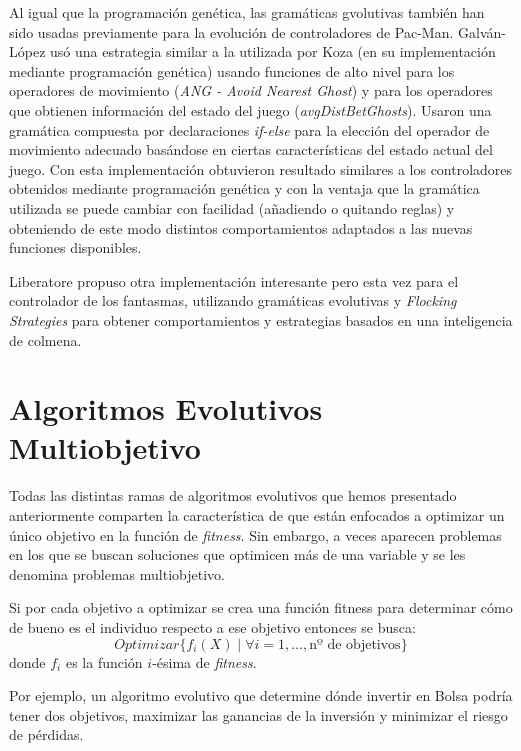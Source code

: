 \blankline

Al igual que la programación genética, las gramáticas gvolutivas también han sido usadas previamente para la evolución de controladores de Pac-Man. Galván-López \cite{galvan2010evolving} usó una estrategia similar a la utilizada por Koza (en su implementación mediante programación genética) usando funciones de alto nivel para los operadores de movimiento (\textit{ANG - Avoid Nearest Ghost}) y para los operadores que obtienen información del estado del juego (\textit{avgDistBetGhosts}). Usaron una gramática compuesta por declaraciones \textit{if-else} para la elección del operador de movimiento adecuado basándose en ciertas características del estado actual del juego. Con esta implementación obtuvieron resultado similares a los controladores obtenidos mediante programación genética y con la ventaja que la gramática utilizada se puede cambiar con facilidad (añadiendo o quitando reglas) y obteniendo de este modo distintos comportamientos adaptados a las nuevas funciones disponibles.

Liberatore \cite{Liberatore2014} propuso otra implementación interesante pero esta vez para el controlador de los fantasmas, utilizando gramáticas evolutivas y \textit{Flocking Strategies} para obtener comportamientos y estrategias basados en una inteligencia de colmena.

\section{Algoritmos Evolutivos Multiobjetivo}
Todas las distintas ramas de algoritmos evolutivos que hemos presentado anteriormente comparten la característica de que están enfocados a optimizar  un único objetivo en la  función de \textit{fitness}. Sin embargo, a veces aparecen problemas en los que se buscan soluciones que optimicen más de una variable y se les denomina problemas multiobjetivo.

Si por cada objetivo a optimizar se crea una función fitness para determinar cómo de bueno es el individuo respecto a ese objetivo entonces se busca:
\begin{equation*}
Optimizar \{f_i(X) \mid \forall i = 1, \dots, \textrm{nº de objetivos}\}
\end{equation*}
donde $f_i$ es la función $i$-ésima de \textit{fitness}.

Por ejemplo, un algoritmo evolutivo que determine dónde invertir en Bolsa podría tener dos objetivos, maximizar las ganancias de la inversión y minimizar el riesgo de pérdidas.

